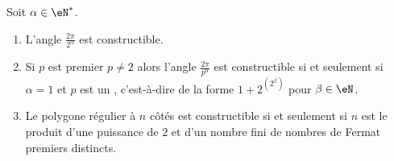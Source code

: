 \begin{theorem}    \label{ThoTWAooEsLjJu}
	Soit \( \alpha\in \eN^*\).
	\begin{enumerate}
		\item   \label{ItemFSEooONDFrSi}
		      L'angle \( \frac{ 2\pi }{ 2^{\alpha} } \) est constructible.
		\item\label{ItemFSEooONDFrSii}
		      Si \( p\) est premier \( p\neq 2\) alors l'angle \( \frac{ 2\pi }{ p^{\alpha} } \) est constructible si et seulement si \( \alpha=1\) et \( p\) est un , c'est-à-dire de la forme \( 1+2^{(2^{\beta})}\) pour \( \beta\in \eN\).
		\item\label{ItemFSEooONDFrSiii}
		      Le polygone régulier à \( n\) côtés est constructible si et seulement si \( n \) est le produit d'une puissance de \( 2\) et d'un nombre fini de nombres de Fermat premiers distincts.
	\end{enumerate}
\end{theorem}

